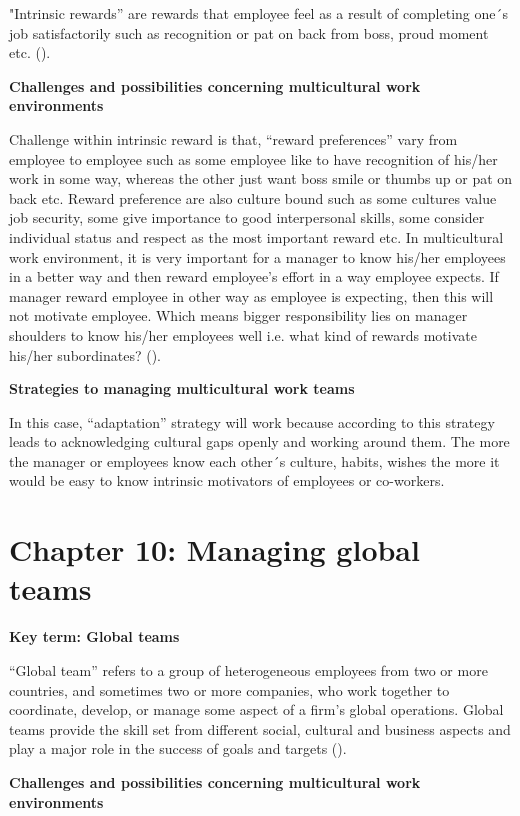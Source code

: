\documentclass{article}
\begin{document}
"Intrinsic rewards” are rewards that employee feel as a result of completing one´s job satisfactorily such as recognition or pat on back from boss, proud moment etc. (\cite[p.~275]{steers2013management}). 

\textbf{Challenges and possibilities concerning multicultural work environments}

Challenge within intrinsic reward is that, “reward preferences” vary from employee to employee such as some employee like to have recognition of his/her work in some way, whereas the other just want boss smile or thumbs up or pat on back etc. Reward preference are also culture bound such as some cultures value job security, some give importance to good interpersonal skills, some consider individual status and respect as the most important reward etc. In multicultural work environment, it is very important for a manager to know his/her employees in a better way and then reward employee’s effort in a way employee expects. If manager reward employee in other way as employee is expecting, then this will not motivate employee. Which means bigger responsibility lies on manager shoulders to know his/her employees well i.e. what kind of rewards motivate his/her subordinates? (\cite[p.~275]{steers2013management}).

\textbf{Strategies to managing multicultural work teams}

In this case, “adaptation” strategy will work because according to \cite{brett2009managing} this strategy leads to acknowledging cultural gaps openly and working around them. The more the manager or employees know each other´s culture, habits, wishes the more it would be easy to know intrinsic motivators of employees or co-workers. 


\section*{Chapter 10: Managing global teams}
\textbf{Key term: Global teams}

“Global team” refers to a group of heterogeneous employees from two or more countries, and sometimes two or more companies, who work together to coordinate, develop, or manage some aspect of a firm's global operations. Global teams provide the skill set from different social, cultural and business aspects and play a major role in the success of goals and targets (\cite[p.~295]{steers2013management}).

\textbf{Challenges and possibilities concerning multicultural work environments}
\end{document}
